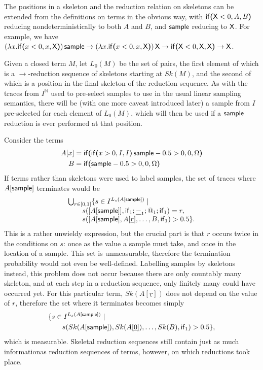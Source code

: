 The positions in a skeleton and the reduction relation on skeletons can be extended from the definitions on terms in the obvious way, with $\mathsf{if}\boldsymbol{(}\mathsf{X} < 0, A, B\boldsymbol{)}$ reducing nondeterministically to both $A$ and $B$, and $\mathsf{sample}$ reducing to $\mathsf{X}$.
For example, we have 
\(
(\lambda x . \mathsf{if}\boldsymbol{(}x < 0, x, \mathsf{X}\boldsymbol{)}) \, \mathsf{sample}
\to
(\lambda x . \mathsf{if}\boldsymbol{(}x < 0, x, \mathsf{X}\boldsymbol{)}) \, \mathsf{X}
\to
\mathsf{if}\boldsymbol{(}\mathsf{X} < 0, \mathsf{X}, \mathsf{X}\boldsymbol{)}
\to
\mathsf{X}
\).

Given a closed term $M$, let $L_0(M)$ be the set of pairs, the first element of which is a $\to$-reduction sequence of skeletons starting at $Sk(M)$, and the second of which is a position in the final skeleton of the reduction sequence. As with the traces from $I^{\mathbb N}$ used to pre-select samples to use in the usual linear sampling semantics, there will be (with one more caveat introduced later) a sample from $I$ pre-selected for each element of $L_0(M)$, which will then be used if a $\mathsf{sample}$ reduction is ever performed at that position.

\begin{example}
Consider the terms
\begin{align*}
A[x] &= \mathsf{if}\boldsymbol{(}\mathsf{if}\boldsymbol{(}x>0, I, I\boldsymbol{)} \, \mathsf{sample} - 0.5 > 0, 0, \Omega\boldsymbol{)}\\
B &= \mathsf{if}\boldsymbol{(}\mathsf{sample} - 0.5 > 0, 0, \Omega\boldsymbol{)}
\end{align*}
If terms rather than skeletons were used to label samples, the set of traces where $A[\mathsf{sample}]$ terminates would be
\[\begin{array}{l}
\bigcup_{r \in [0,1]} \{s \in I^{L_s(A[\mathsf{sample}])} \mid \\
\qquad s([A[\mathsf{sample}]], \mathsf{if}_1;\underline{-}_1;@_1;\mathsf{if}_1) = r, \\
\qquad s([A[\mathsf{sample}], A[\underline r], \ldots, B, \mathsf{if}_1) > 0.5 \}.
\end{array}\] 
This is a rather unwieldy expression, but the crucial part is that $r$ occurs twice in the conditions on $s$: once as the value a sample must take, and once in the location of a sample. This set is unmeasurable, therefore the termination probability would not even be well-defined. Labelling samples by skeletons instead, this problem does not occur because there are only countably many skeleton, and at each step in a reduction sequence, only finitely many could have occurred yet. For this particular term, $Sk(A[\underline r])$ does not depend on the value of $r$, therefore the set where it terminates becomes simply
\begin{align*}
&\{s \in I^{L_s(A[\mathsf{sample}])} \mid \\
&\qquad s(Sk(A[\mathsf{sample}]), Sk(A[\underline 0]), \ldots, Sk(B), \mathsf{if}_1) > 0.5 \},
\end{align*}
which is measurable. Skeletal reduction sequences still contain just as much informationas reduction sequences of terms, however, on which reductions took place.
\end{example}

